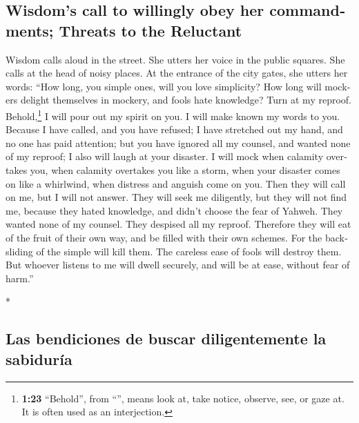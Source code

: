 \begin{paracol}{2}
\begin{otherlanguage}{english}
{\subsection{Wisdom's call to willingly obey her commandments; Threats to
the
Reluctant}\label{wisdoms-call-to-willingly-obey-her-commandments-threats-to-the-reluctant}}

 Wisdom calls aloud in the street. She utters her voice
in the public squares.  She calls at the head of noisy
places. At the entrance of the city gates, she utters her words:
 ``How long, you simple ones, will you love simplicity?
How long will mockers delight themselves in mockery, and fools hate
knowledge?  Turn at my reproof. Behold,\footnote{\textbf{1:23}
  ``Behold'', from ``'', means look at, take notice,
  observe, see, or gaze at. It is often used as an interjection.} I will
pour out my spirit on you. I will make known my words to you.
 Because I have called, and you have refused; I have
stretched out my hand, and no one has paid attention; 
but you have ignored all my counsel, and wanted none of my reproof;
 I also will laugh at your disaster. I will mock when
calamity overtakes you,  when calamity overtakes you like
a storm, when your disaster comes on like a whirlwind, when distress and
anguish come on you.  Then they will call on me, but I
will not answer. They will seek me diligently, but they will not find
me,  because they hated knowledge, and didn't choose the
fear of Yahweh.  They wanted none of my counsel. They
despised all my reproof.  Therefore they will eat of the
fruit of their own way, and be filled with their own schemes.
 For the backsliding of the simple will kill them. The
careless ease of fools will destroy them.  But whoever
listens to me will dwell securely, and will be at ease, without fear of
harm.''

\end{otherlanguage}

\switchcolumn[0]*

\hypertarget{las-bendiciones-de-buscar-diligentemente-la-sabiduruxeda}{%
\subsection{Las bendiciones de buscar diligentemente la
sabiduría}\label{las-bendiciones-de-buscar-diligentemente-la-sabiduruxeda}}


\end{paracol}
